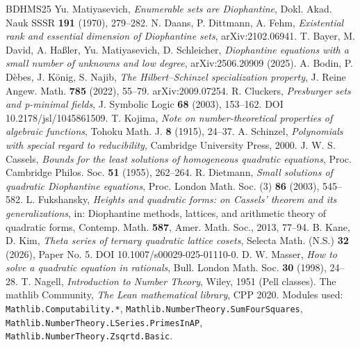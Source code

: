 \begin{thebibliography}{BDHMS25}
 Yu. Matiyasevich, \emph{Enumerable sets are Diophantine}, Dokl. Akad. Nauk SSSR \textbf{191} (1970), 279–282.
 N. Daans, P. Dittmann, A. Fehm, \emph{Existential rank and essential dimension of Diophantine sets}, arXiv:2102.06941.
 T. Bayer, M. David, A. Haßler, Yu. Matiyasevich, D. Schleicher, \emph{Diophantine equations with a small number of unknowns and low degree}, arXiv:2506.20909 (2025).
 A. Bodin, P. Dèbes, J. König, S. Najib, \emph{The Hilbert--Schinzel specialization property}, J. Reine Angew. Math. \textbf{785} (2022), 55--79. arXiv:2009.07254.
 R. Cluckers, \emph{Presburger sets and p-minimal fields}, J. Symbolic Logic \textbf{68} (2003), 153–162. DOI 10.2178/jsl/1045861509.
 T. Kojima, \emph{Note on number-theoretical properties of algebraic functions}, Tohoku Math. J. \textbf{8} (1915), 24--37.
 A. Schinzel, \emph{Polynomials with special regard to reducibility}, Cambridge University Press, 2000.
 J. W. S. Cassels, \emph{Bounds for the least solutions of homogeneous quadratic equations}, Proc. Cambridge Philos. Soc. \textbf{51} (1955), 262–264.
 R. Dietmann, \emph{Small solutions of quadratic Diophantine equations}, Proc. London Math. Soc. (3) \textbf{86} (2003), 545–582.
 L. Fukshansky, \emph{Heights and quadratic forms: on Cassels' theorem and its generalizations}, in: Diophantine methods, lattices, and arithmetic theory of quadratic forms, Contemp. Math. \textbf{587}, Amer. Math. Soc., 2013, 77–94.
 B. Kane, D. Kim, \emph{Theta series of ternary quadratic lattice cosets}, Selecta Math. (N.S.) \textbf{32} (2026), Paper No. 5. DOI 10.1007/s00029-025-01110-0.
 D. W. Masser, \emph{How to solve a quadratic equation in rationals}, Bull. London Math. Soc. \textbf{30} (1998), 24–28.
 T. Nagell, \emph{Introduction to Number Theory}, Wiley, 1951 (Pell classes).
 The mathlib Community, \emph{The Lean mathematical library}, CPP 2020. Modules used: \texttt{Mathlib.\allowbreak{}Computability.\allowbreak{}*}, \texttt{Mathlib.\allowbreak{}NumberTheory.\allowbreak{}SumFourSquares}, \texttt{Mathlib.\allowbreak{}NumberTheory.\allowbreak{}LSeries.\allowbreak{}PrimesInAP}, \texttt{Mathlib.\allowbreak{}NumberTheory.\allowbreak{}Zsqrtd.\allowbreak{}Basic}.
\end{thebibliography}
